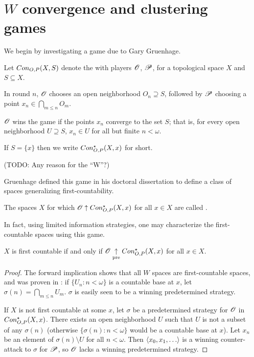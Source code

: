 
\chapter{$W$ convergence and clustering games}

We begin by investigating a game due to Gary Gruenhage.

\begin{game}
  Let $Con_{O,P}(X,S)$ denote the  with
  players $\mathscr{O}$, $\mathscr{P}$, for a topological space $X$ and $S\subseteq X$.

  In round $n$, $\mathscr{O}$ chooses an open neighborhood $O_n\supseteq S$, followed
  by $\mathscr{P}$ choosing a point $x_n\in \bigcap_{m\leq n}O_m$.

  $\mathscr{O}$ wins the game if the points $x_n$ converge to the set $S$; that is,
  for every open neighborhood $U\supseteq S$, $x_n\in U$ for
  all but finite $n<\omega$.

  If $S=\{x\}$ then we write $Con_{O,P}^\star(X,x)$ for short.
\end{game}

(TODO: Any reason for the ``W''?)

Gruenhage defined this game in his doctoral dissertation to define a class
of spaces generalizing first-countability. \cite{MR0413049}

\begin{defn}
  The spaces $X$ for which $\mathscr{O} \uparrow Con_{O,P}^\star(X,x)$ for all $x\in X$ are
  called .
\end{defn}

In fact, using limited information strategies, one may characterize the
first-countable spaces using this game.

\begin{prop}
  $X$ is first countable
    if and only if
  $\mathscr{O} \underset{\text{pre}}{\uparrow} Con_{O,P}^\star(X,x)$ for all $x\in X$.
\end{prop}

\begin{proof}
  The forward implication shows that all $W$ spaces are first-countable spaces,
  and was proven in \cite{MR0413049}: if $\{U_n:n<\omega\}$ is a countable
  base at $x$, let $\sigma(n)=\bigcap_{m\leq n} U_m$. $\sigma$ is easily seen
  to be a winning predetermined strategy.

  If $X$ is not first countable at some $x$, let $\sigma$ be a
  predetermined strategy for $\mathscr{O}$ in $Con_{O,P}^\star(X,x)$. There exists
  an open neighborhood $U$ such that $U$ is not a subset of any $\sigma(n)$
  (otherwise $\{\sigma(n):n<\omega\}$ would be a countable base at $x$).
  Let $x_n$ be an element of $\sigma(n)\setminus U$ for all $n<\omega$.
  Then $\<x_0,x_1,\dots\>$ is a winning counter-attack to $\sigma$ for $\mathscr{P}$,
  so $\mathscr{O}$ lacks a winning predetermined strategy.
\end{proof}

